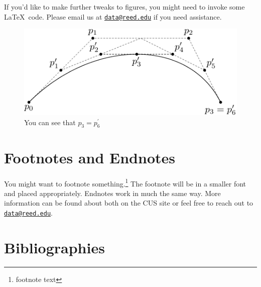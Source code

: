 \documentclass[12pt,twoside]{reedthesis}
\begin{document}
  If you'd like to make further tweaks to figures, you might need to
  invoke some \LaTeX~code. Please email us at
  \href{mailto:data@reed.edu}{\nolinkurl{data@reed.edu}} if you need
  assistance.
  
  \begin{Shaded}
  \begin{Highlighting}[]
  \NormalTok{(}\NormalTok{, }
         \NormalTok{,}
         \CharTok{\textbackslash{}\textbackslash{}}\NormalTok{,}
         \NormalTok{,}
         \NormalTok{)}
  \end{Highlighting}
  \end{Shaded}
  
  \begin{figure}[h!tbp]
  \centering
  \includegraphics[angle = 0,scale = 1]{figure/subdivision.pdf}
  \caption[Subdivision of arc segments]{\footnotesize{You can see that $p_3 = p_6^\prime$}}
  \label{fig:subd3}
  \end{figure}
  
  \section{Footnotes and Endnotes}\label{footnotes-and-endnotes}
  
  You might want to footnote something.\footnote{footnote text} The
  footnote will be in a smaller font and placed appropriately. Endnotes
  work in much the same way. More information can be found about both on
  the CUS site or feel free to reach out to
  \href{mailto:data@reed.edu}{\nolinkurl{data@reed.edu}}.
  
  \section{Bibliographies}\label{bibliographies}
  
\end{document}
